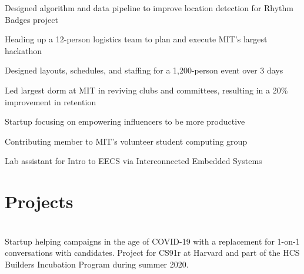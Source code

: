 \documentclass[]{deedy-resume-openfont}
\begin{document}
\hfill {}
\begin{tightemize}
	\item Designed algorithm and data pipeline to improve location detection for Rhythm Badges project
\end{tightemize}
\sectionsep

\hfill {}
\begin{tightemize}
    \item Heading up a 12-person logistics team to plan and execute MIT's largest hackathon 
    \item Designed layouts, schedules, and staffing for a 1,200-person event over 3 days
\end{tightemize}
\sectionsep

\hfill {}
\begin{tightemize}
    \item Led largest dorm at MIT in reviving clubs and committees, resulting in a 20\% improvement in retention
\end{tightemize}
\sectionsep

\descript{}\hfill \location{}
\begin{tightemize}
    \item {} Startup focusing on empowering influencers to be more productive
    \item {} Contributing member to MIT's volunteer student computing group
    \item {} Lab assistant for Intro to EECS via Interconnected Embedded Systems
\end{tightemize}
\sectionsep

\section{Projects}
\raggedright

\hfill {}\\
Startup helping campaigns in the age of COVID-19 with a replacement for 1-on-1 conversations with candidates.
\newline
Project for CS91r at Harvard and part of the HCS Builders Incubation Program during summer 2020.
\sectionsep
\end{document}
